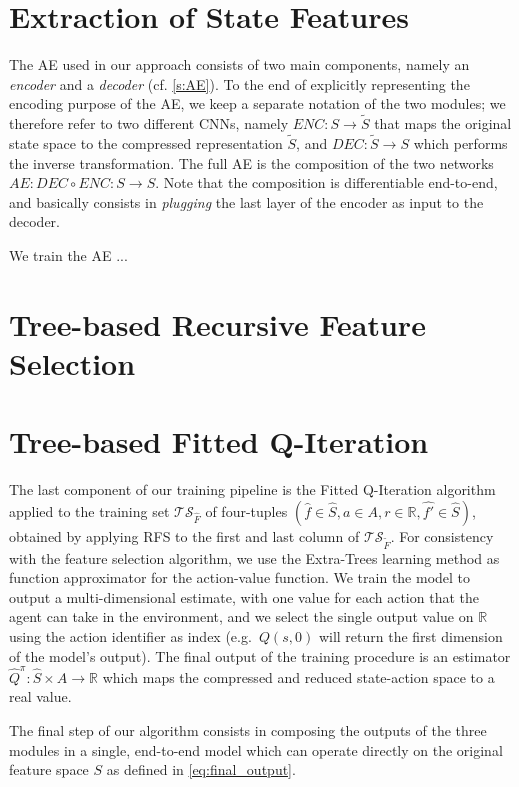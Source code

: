 \section{Extraction of State Features}
The AE used in our approach consists of two main components, namely an 
\textit{encoder} and a \textit{decoder} (cf. \ref{s:AE}). To the end of 
explicitly representing the encoding purpose of the AE, we keep a separate 
notation of the two modules; we therefore refer to two different CNNs, namely 
$ENC: S \rightarrow \tilde{S}$ that maps the original state space to the 
compressed representation $\tilde{S}$, and $DEC: \tilde{S} \rightarrow S$ which
performs the inverse transformation. The full AE is the composition of the two 
networks $AE: DEC \circ ENC: S \rightarrow S$. Note that the composition is 
differentiable end-to-end, and basically consists in \textit{plugging} the last
layer of the encoder as input to the decoder. 

We train the AE ...

\section{Tree-based Recursive Feature Selection}

\section{Tree-based Fitted Q-Iteration}
The last component of our training pipeline is the Fitted Q-Iteration algorithm 
applied to the training set $\mathcal{TS}_{\hat{F}}$ of four-tuples
$(\hat{f} \in \hat{S}, a \in A, r \in \mathbb{R}, \hat{f'} \in \hat{S})$, 
obtained by applying RFS to the first and last column of 
$\mathcal{TS}_{\tilde{F}}$.
For consistency with the feature selection algorithm, we use the Extra-Trees 
learning method as function approximator for the action-value function. 
We train the model to output a multi-dimensional estimate, with one value for 
each action that the agent can take in the environment, and we select the single
output value on $\mathbb{R}$ using the action identifier as index (e.g.\ 
$Q(s, 0)$ will return the first dimension of the model's output). 
The final output of the training procedure is an estimator 
$\hat{Q}^\pi: \hat{S} \times A \rightarrow \mathbb{R}$ which maps the compressed
and reduced state-action space to a real value. 

 
The final step of our algorithm consists in composing the outputs of the three 
modules in a single, end-to-end model which can operate directly on the original
feature space $S$ as defined in \eqref{eq:final_output}.
